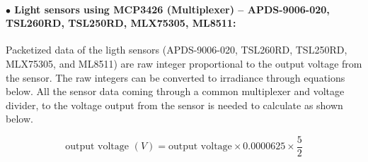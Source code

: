\paragraph{$\bullet$ Light sensors using MCP3426 (Multiplexer) -- APDS-9006-020, TSL260RD, TSL250RD, MLX75305, ML8511:}
Packetized data of the ligth sensors (APDS-9006-020, TSL260RD, TSL250RD, MLX75305, and ML8511) are raw integer proportional to the output voltage from the sensor.  The raw integers can be converted to irradiance through equations below. 
\newline \newline
All the sensor data coming through a common multiplexer and voltage divider, to the voltage output from the sensor is needed to calculate as shown below.

\bigbreak

{\centering
 \[ \text{output voltage }(V) =  \text{output voltage} \times 0.0000625 \times \frac{5}{2} \]
 \par
 }

